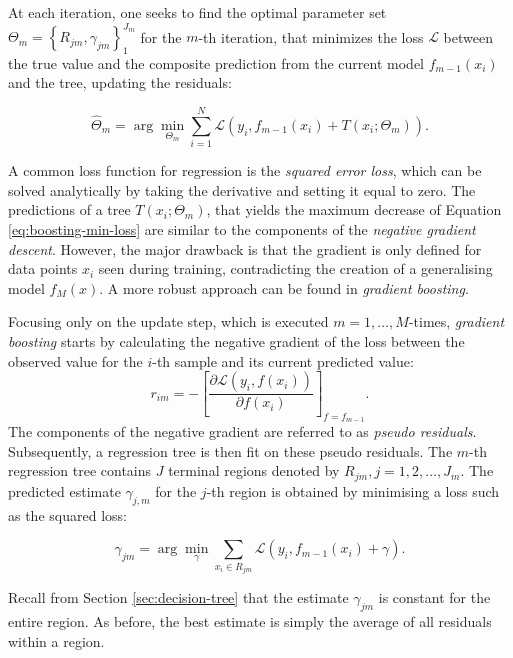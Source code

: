   At each iteration, one seeks to find the optimal parameter set $\Theta_{m}=\left\{R_{j m}, \gamma_{j m}\right\}_{1}^{J_{m}}$ for the $m$-th iteration, that minimizes the loss $\mathcal{L}$ between the true value and the composite prediction from the current model $f_{m-1}\left(x_{i}\right)$ and the tree, updating the residuals:
  
  \begin{equation}
    \label{eq:boosting-min-loss}
    \hat{\Theta}_{m}=\arg \min _{\Theta_{m}} \sum_{i=1}^{N} \mathcal{L}\left(y_{i}, f_{m-1}\left(x_{i}\right)+T\left(x_{i} ; \Theta_{m}\right)\right).
  \end{equation}
  
  A common loss function for regression is the \textit{squared error loss}, which can be solved analytically by taking the derivative and setting it equal to zero. The predictions of a tree $T\left(x_{i}; \Theta_{m}\right)$, that yields the maximum decrease of Equation \ref{eq:boosting-min-loss} are similar to the components of the \textit{negative gradient descent}. However, the major drawback is that the gradient is only defined for data points $x_i$ seen during training, contradicting the creation of a generalising model $f_{M}(x)$. A more robust approach can be found in \textit{gradient boosting}.
  
  Focusing only on the update step, which is executed $m = 1,\ldots, M$-times, \textit{gradient boosting} starts by calculating the negative gradient of the loss between the observed value for the $i$-th sample and its current predicted value:
  $$
    r_{i m}=-{\left[\frac{\partial \mathcal{L}\left(y_{i}, f\left(x_{i}\right)\right)}{\partial f\left(x_{i}\right)}\right]}_{f=f_{m-1}}.
  $$
  The components of the negative gradient are referred to as \textit{pseudo residuals}. Subsequently, a regression tree is then fit on these pseudo residuals. The $m$-th regression tree contains $J$ terminal regions denoted by $R_{j m}, j=1,2, \ldots, J_{m}$. The predicted estimate $\gamma_{j,m}$ for the $j$-th region is obtained by minimising a loss such as the squared loss:
  
  $$
    \gamma_{j m}=\arg \min _{\gamma} \sum_{x_{i} \in R_{j m}} \mathcal{L}\left(y_{i}, f_{m-1}\left(x_{i}\right)+\gamma\right).
  $$
  
  Recall from Section
   \ref{sec:decision-tree} that the estimate $\gamma_{jm}$ is constant for the entire region. As before, the best estimate is simply the average of all residuals within a region.
  
